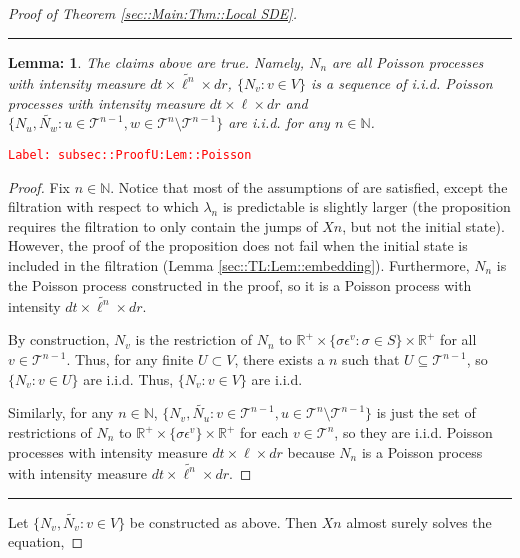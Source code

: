 \documentclass[12pt]{article}
\newcommand{\mb}{\mathbb}
\newcommand{\mc}{\mathcal}
\newcommand{\ep}{\epsilon}
\newcommand{\tr}{\textcolor{red}}
\newcommand{\labe}[1]{\tr{\texttt{Label: #1}}}
\newcommand{\ind}{\hspace{24pt}}
\newcommand{\lin}{\rule{\linewidth}{0.4 pt}}
\renewcommand{\v}{v}							%
\newcommand{\vv}{u}								%
\newcommand{\vvv}{w}							%
\renewcommand{\U}{U}							%
\renewcommand{\S}{S}							%
\newcommand{\s}{\sigma}							%
\newcommand{\ev}[1]{\ep^{#1}}					%
\renewcommand{\t}{t}							%
\newcommand{\X}{X}								%
\newcommand{\poiss}[1]{N_{#1}}						%
\newcommand{\pup}[1]{^{#1}}							%
\newcommand{\tree}{\mc{T}}							%
\newcommand{\V}{V}									%
\renewcommand{\r}{r}								%
\newcommand{\numb}{n}								%
\newcommand{\rate}[1]{\lambda_{#1}}					%
\newcommand{\Sm}{\ell}								%
\newcommand{\alt}{\widetilde}						%
\newtheorem{lem}[thms]{Lemma: }
\begin{document}
\begin{proof}[Proof of Theorem \ref{sec::Main:Thm::Local SDE}]
\lin

\begin{lem}
The claims above are true. Namely, \(\poiss{\numb}\) are all Poisson processes with intensity measure \(d\t\times\alt{\Sm^{\numb}}\times d\r\), \(\{\poiss{\v}:\v\in\V\}\) is a sequence of i.i.d. Poisson processes with intensity measure \(d\t\times\Sm\times d\r\) and \(\{\poiss{\vv},\alt{\poiss{\vvv}}:\vv\in \tree\pup{\numb-1},\vvv\in\tree\pup{\numb}\setminus\tree\pup{\numb-1}\}\) are i.i.d. for any \(\numb \in \mb{N}\).

\label{subsec::ProofU:Lem::Poisson}
\end{lem}
\labe{subsec::ProofU:Lem::Poisson}
\begin{proof}

Fix \(\numb \in \mb{N}\). Notice that most of the assumptions of \cite[Proposition 14.7.I(b)]{DalVer08} are satisfied, except the filtration with respect to which \(\rate{\numb}\) is predictable is slightly larger (the proposition requires the filtration to only contain the jumps of \(\X{}{}{\numb}\), but not the initial state). However, the proof of the proposition does not fail when the initial state is included in the filtration (Lemma \ref{sec::TL:Lem::embedding}). Furthermore, \(\poiss{\numb}\) is the Poisson process constructed in the proof, so it is a Poisson process with intensity \(d\t\times \alt{\Sm^\numb}\times d\r\).

\ind By construction, \(\poiss{\v}\) is the restriction of \(\poiss{\numb}\) to \(\mb{R}^+ \times \{\s\ev{\v}: \s\in \S\}\times \mb{R}^+\) for all \(\v\in \tree\pup{\numb-1}\). Thus, for any finite \(\U \subset \V\), there exists a \(\numb\) such that \(\U \subseteq \tree\pup{\numb-1}\), so \(\{\poiss{\v}: \v\in \U\}\) are i.i.d. Thus, \(\{\poiss{\v}: \v\in \V\}\) are i.i.d.

\ind Similarly, for any \(\numb \in \mb{N}\), \(\{\poiss{\v},\alt{\poiss{\vv}}: \v \in \tree\pup{\numb-1},\vv\in\tree\pup{\numb}\setminus\tree\pup{\numb-1}\}\) is just the set of restrictions of \(\poiss{\numb}\) to \(\mb{R}^+\times\{\s\ev{\v}\}\times\mb{R}^+\) for each \(\v\in \tree\pup{\numb}\), so they are i.i.d. Poisson processes with intensity measure \(d\t\times \Sm\times d\r\) because \(\poiss{\numb}\) is a Poisson process with intensity measure \(d\t\times\alt{\Sm^\numb}\times d\r\).
\end{proof}

\lin

Let \(\{\poiss{\v},\alt{\poiss{\v}}:\v\in\V\}\) be constructed as above. Then \(\X{}{}{\numb}\) almost surely solves the equation,


\end{proof}
\end{document}
